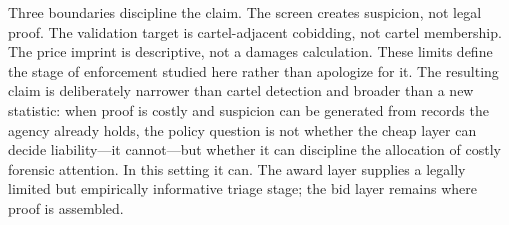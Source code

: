 Three boundaries discipline the claim. The screen creates
suspicion, not legal proof. The validation target is
cartel-adjacent cobidding, not cartel membership. The price
imprint is descriptive, not a damages calculation. These limits
define the stage of enforcement studied here rather than
apologize for it. The resulting claim is deliberately narrower
than cartel detection and broader than a new statistic: when
proof is costly and suspicion can be generated from records the
agency already holds, the policy question is not whether the
cheap layer can decide liability---it cannot---but whether it
can discipline the allocation of costly forensic attention. In
this setting it can. The award layer supplies a legally limited
but empirically informative triage stage; the bid layer remains
where proof is assembled.
